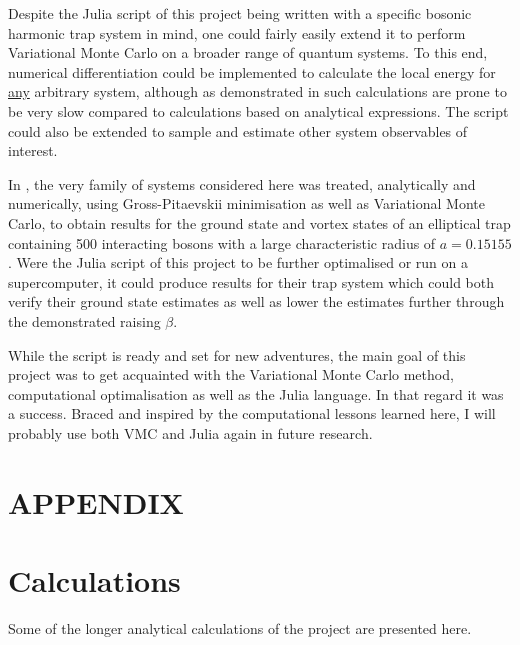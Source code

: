 \documentclass[a4paper,8pt]{article}
\begin{document}
\begin{multicols}{2}
Despite the Julia script of this project being written with a specific bosonic harmonic trap system in mind, one could fairly easily extend it to perform Variational Monte Carlo on a broader range of quantum systems. To this end, numerical differentiation could be implemented to calculate the local energy for \underline{any} arbitrary system, although as demonstrated in \cite{SWL} such calculations are prone to be very slow compared to calculations based on analytical expressions. The script could also be extended to sample and estimate other system observables of interest.

In \cite{NMPGHJP}, the very family of systems considered here was treated, analytically and numerically, using Gross-Pitaevskii minimisation as well as Variational Monte Carlo, to obtain results for the ground state and vortex states of an elliptical trap containing 500 interacting bosons with a large characteristic radius of ${a = 0.15155}$. Were the Julia script of this project to be further optimalised or run on a supercomputer, it could produce results for their trap system which could both verify their ground state estimates as well as lower the estimates further through the demonstrated raising $\beta$.

While the script is ready and set for new adventures, the main goal of this project was to get acquainted with the Variational Monte Carlo method, computational optimalisation as well as the Julia language. In that regard it was a success. Braced and inspired by the computational lessons learned here, I will probably use both VMC and Julia again in future research.

\end{multicols}




\newpage
\appendix
\setcounter{equation}{0}
\renewcommand{\theequation}{\thesection\arabic{equation}}
\section*{APPENDIX}
\section{Calculations}
Some of the longer analytical calculations of the project are presented here.
\end{document}

